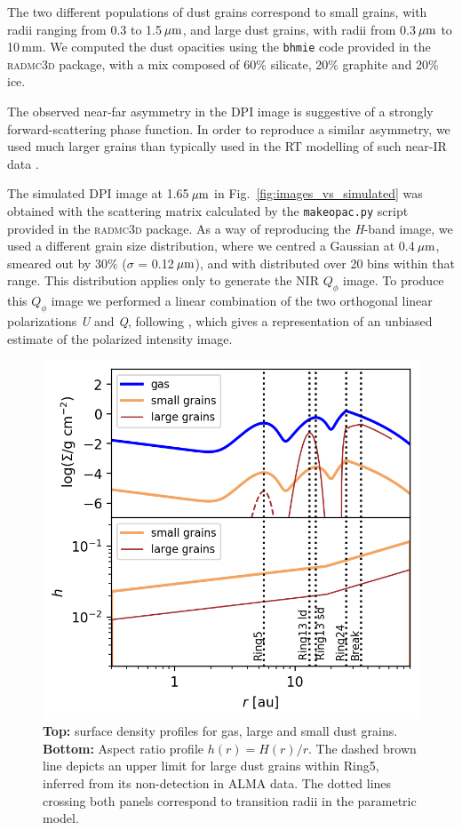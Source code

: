 \documentclass[fleqn,usenatbib,useAMS]{mnras}
\begin{document}
The two different populations of dust grains correspond to small grains, with radii ranging from 0.3 to 1.5\,$\hbox{$\mu$m}$, and large dust grains, with radii from 0.3\,$\hbox{$\mu$m}$ to 10\,mm. We computed the dust opacities using the {\tt bhmie} code provided in the \textsc{radmc3d} package, with a mix composed of 60\% silicate, 20\% graphite and 20\% ice. 

The observed near-far asymmetry in the DPI image is suggestive of a strongly forward-scattering phase function. In order to reproduce a similar asymmetry, we used much larger grains than typically used in the RT modelling of such near-IR data \citep[e.g.,][]{2018MNRAS.477.5104C}. 

The simulated DPI image at 1.65\,$\hbox{$\mu$m}$ in Fig.~\ref{fig:images_vs_simulated} was obtained with the scattering matrix calculated by the {\tt makeopac.py} script provided in the \textsc{radmc3d} package. As a way of reproducing the \textit{H}-band image, we used a different grain size distribution, where we centred a Gaussian at 0.4\,$\hbox{$\mu$m}$, smeared out by 30\% ($\sigma$ = 0.12\,$\hbox{$\mu$m}$), and with distributed over 20 bins within that range. This distribution applies only to generate the NIR $Q_\phi$ image. To produce this $Q_\phi$ image we performed a linear combination of the two orthogonal linear polarizations \textit{U} and \textit{Q}, following \citet{Avenhaus_2017}, which gives a representation of an unbiased estimate of the polarized intensity image.

\begin{figure}
	\includegraphics[width=\columnwidth]{allprofiles.png}
        \caption{{\bf Top:} surface density profiles for gas, large and small dust grains. {\bf Bottom:} Aspect ratio profile $h(r)= H(r)/r$. The dashed brown line depicts an upper limit for large dust grains within Ring5, inferred from its non-detection in ALMA data. The dotted lines crossing both panels correspond to transition radii in the parametric model.}
    \label{fig:profiles}
\end{figure}
\end{document}
